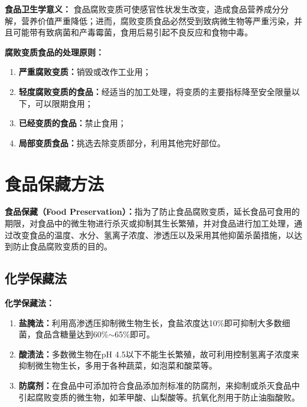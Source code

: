\begin{keybox}
\textbf{食品卫生学意义：}
食品腐败变质可使感官性状发生改变，造成食品营养成分分解，营养价值严重降低；进而，腐败变质食品必然受到致病微生物等严重污染，并且可能带有致病菌和产毒霉菌，食用后易引起不良反应和食物中毒。

\textbf{腐败变质食品的处理原则：}
\begin{enumerate}[leftmargin=*]
    \item \textbf{严重腐败变质：}销毁或改作工业用；
    \item \textbf{轻度腐败变质的食品：}经适当的加工处理，将变质的主要指标降至安全限量以下，可以限期食用；
    \item \textbf{已经变质的食品：}禁止食用；
    \item \textbf{局部变质食品：}挑选去除变质部分，利用其他完好部位。
\end{enumerate}
\end{keybox}

\section{食品保藏方法}

\begin{defbox}
\textbf{食品保藏（Food Preservation）：}指为了防止食品腐败变质，延长食品可食用的期限，对食品中的微生物进行杀灭或抑制其生长繁殖，并对食品进行加工处理，通过改变食品的温度、水分、氢离子浓度、渗透压以及采用其他抑菌杀菌措施，以达到防止食品腐败变质的目的。
\end{defbox}

\subsection{化学保藏法}

\begin{keybox}
\textbf{化学保藏法：}
\begin{enumerate}[leftmargin=*]
    \item \textbf{盐腌法：}利用高渗透压抑制微生物生长，食盐浓度达10\%即可抑制大多数细菌，食品含糖量达到60\%$\sim$65\%即可。
    \item \textbf{酸渍法：}多数微生物在pH 4.5以下不能生长繁殖，故可利用控制氢离子浓度来抑制微生物生长，多用于各种蔬菜，如泡菜和酸菜等。
    \item \textbf{防腐剂：}在食品中可添加符合食品添加剂标准的防腐剂，来抑制或杀灭食品中引起腐败变质的微生物，如苯甲酸、山梨酸等。抗氧化剂用于防止油脂酸败。
\end{enumerate}
\end{keybox}


